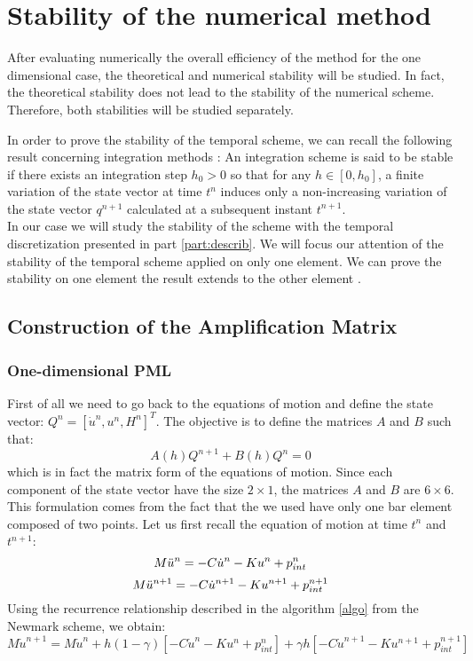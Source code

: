 \section{Stability of the numerical method}
After evaluating numerically the overall efficiency of the method for the one dimensional case, the theoretical and numerical stability will be studied. In fact, the theoretical stability does not lead to the stability of the numerical scheme. Therefore, both stabilities will be studied separately.

In order to prove the stability of the temporal scheme, we can recall the following result concerning integration methods \cite{Geradin}: An integration scheme is said to be stable if there exists an integration step $h_0 > 0$ so that for any $h \in [0, h_0]$, a finite variation of the state vector at time $t^n$ induces only a non-increasing variation of the state vector $q^{n+1}$ calculated at a subsequent instant $t^{n+1}$.\\
In our case we will study the stability of the scheme with the temporal discretization presented in part \ref{part:describ}. We will focus our attention of the stability of the temporal scheme applied on only one element. We can prove the stability on one element the result extends to the other element \cite{Belytschko}. 
\subsection{Construction of the Amplification Matrix}
\subsubsection{One-dimensional PML}
First of all we need to go back to the equations of motion and define the state vector: $Q^n = [\dot{u}^n, u^n, H^n]^T$.
The objective is to define the matrices $A$ and $B$ such that:
\begin{equation}
    A(h) Q^{n+1} + B(h) Q^{n} = 0
    \label{eq:matrix_form}
\end{equation}
which is in fact the matrix form of the equations of motion. Since each component of the state vector have the size $2 \times 1$, the matrices $A$ and $B$ are $6 \times 6$. This formulation comes from the fact that the we used have only one bar element composed of two points.    
Let us first recall the equation of motion at time $t^n$ and $t^{n+1}$:
\begin{equation}
    M  \Ddot{u}^n = -C \Dot{u}^n - K u^n +p_{int}^n 
\end{equation}
\begin{equation}
    M \Ddot{u}^{n+1} = -C \Dot{u}^{n+1} - K u^{n+1} +p_{int}^{n+1} 
\end{equation}
Using the recurrence relationship described in the algorithm \ref{algo} from the Newmark scheme, we obtain:
\begin{equation}
    M \dot{u}^{n+1} = M\Dot{u}^{n} + h(1-\gamma)\left[ -C \Dot{u}^n - K u^n +p_{int}^n   \right] + \gamma h \left[ -C \Dot{u}^{n+1} - K u^{n+1} +p_{int}^{n+1} \right]
    \label{eq:rec1}
\end{equation}

